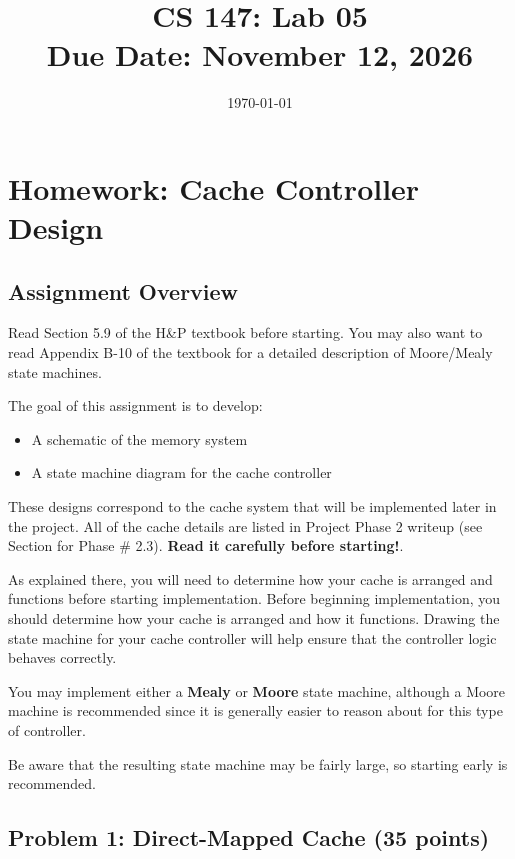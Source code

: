 \documentclass[12pt]{article}
\title{CS 147: Lab 05 \\ Due Date: November 12, 2026}
\author{}
\date{\today}
\begin{document}
\frenchspacing
\maketitle

\section*{Homework: Cache Controller Design}

\subsection*{Assignment Overview}

Read Section 5.9 of the H\&P textbook before starting.  You may also
want to read Appendix B-10 of the textbook for a detailed description
of Moore/Mealy state machines.

The goal of this assignment is to develop:

\begin{itemize}
\item A schematic of the memory system
\item A state machine diagram for the cache controller
\end{itemize}

These designs correspond to the cache system that will be implemented later in the project.
All of the cache details are listed in Project Phase 2 writeup (see Section for Phase \# 2.3).
\textbf{Read it carefully before starting!}.

As explained there, you will need to determine how your cache is arranged and functions before starting
implementation. 
Before beginning implementation, you should determine how your cache is arranged and how it functions.
Drawing the state machine for your cache controller will help ensure that the controller logic behaves correctly.

You may implement either a \textbf{Mealy} or \textbf{Moore} state machine, although a Moore machine is recommended since it is generally easier to reason about for this type of controller.

Be aware that the resulting state machine may be fairly large, so starting early is recommended.

\subsection*{Problem 1: Direct-Mapped Cache (35 points)}
\end{document}
